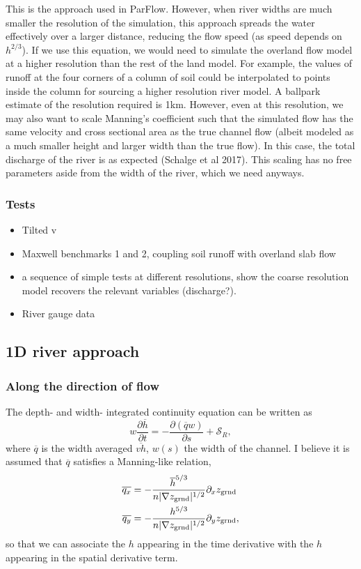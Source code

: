\documentclass[twoside,10pt]{report}
\begin{document}
This is the approach used in ParFlow. However, when river widths are much smaller the resolution of the simulation, this approach spreads the water effectively over a larger distance, reducing the flow speed (as speed depends on $h^{2/3}$). If we use this equation, we would need to simulate the overland flow model at a higher resolution than the rest of the land model. For example, the values of runoff at the four corners of a column of soil could be interpolated to points inside the column for sourcing a higher resolution river model. A ballpark estimate of the resolution required is 1km. However, even at this resolution, we may also want to scale Manning's coefficient such that the simulated flow has the same velocity and cross sectional area as the true channel flow (albeit modeled as a much smaller height and larger width than the true flow). In this case, the total discharge of the river is as expected (Schalge et al 2017). This scaling has no free parameters aside from the width of the river, which we need anyways.
\subsubsection{Tests}
\begin{itemize}
    \item Tilted v
    \item Maxwell benchmarks 1 and 2, coupling soil runoff with overland slab flow
    \item a sequence of simple tests at different resolutions, show the coarse resolution model recovers the relevant variables (discharge?).
    \item River gauge data
\end{itemize}
\subsection{1D river approach}
\subsubsection{Along the direction of flow}
The depth- and width- integrated continuity equation can be written as
\begin{equation}
    w\frac{\partial \overline{h}}{\partial t} = -\frac{\partial (\overline{q} w)}{\partial s}  +  \mathcal{S}_R,
\end{equation}
where $\overline{q}$ is the width averaged $\overline{vh}$, $w(s)$ the width of the channel. I believe it is assumed that $\overline{q}$ satisfies a Manning-like relation,
\begin{align}\label{vel_kinematic2}
     \overline{q_x} & = -\frac{\overline{h}^{5/3}}{n|\nabla z_{\rm grnd}|^{1/2}} \partial_x z_{\rm grnd} \nonumber \\
     \overline{q_y} & =-\frac{h^{5/3}}{n|\nabla z_{\rm grnd}|^{1/2}} \partial_y z_{\rm grnd},
\end{align}
so that we can associate the $h$ appearing in the time derivative with the $h$ appearing in the spatial derivative term.
\end{document}
